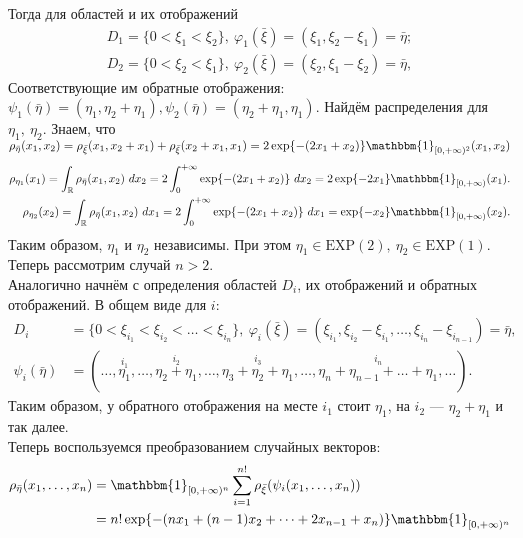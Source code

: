 \documentclass[specialist,
substylefile = spbu_report.rtx,
subf,href,colorlinks=true, 12pt]{disser}
\newcommand{\R}{\mathbb{R}}
\begin{document}
	Тогда для областей и их отображений
	\begin{align*}
		D_1 = \{0 < \xi_1 < \xi_2\},~\varphi_1(\bar{\xi}) = (\xi_1, \xi_2 - \xi_1) = \bar{\eta};
		\\D_2 = \{0 < \xi_2 < \xi_1\},~\varphi_2(\bar{\xi}) = (\xi_2, \xi_1 - \xi_2) = \bar{\eta},
	\end{align*}
	Соответствующие им обратные отображения: $\psi_1(\bar{\eta}) = (\eta_1, \eta_2 + \eta_1), \psi_2(\bar{\eta}) = (\eta_2 + \eta_1, \eta_1)$. Найдём распределения для $\eta_1,~\eta_2$. Знаем, что $\rho_{\bar{\eta}}(x_1, x_2) = \rho_{\bar{\xi}}(x_1, x_2 + x_1) + \rho_{\bar{\xi}}(x_2+x_1, x_1) = 2\exp\{-(2x_1 + x_2)\}\mathbbm{1}_{[0,+\infty)^2}(x_1,x_2)$
	\begin{align*}
		\rho_{\eta_1}(x_1) = \int_\R \rho_{\bar{\eta}}(x_1, x_2)~dx_2 = 2\int_0^{+\infty}\exp\{-(2x_1 + x_2)\}~dx_2 = 2\exp\{-2x_1\}\mathbbm{1}_{[0,+\infty)}(x_1).\\
		\rho_{\eta_2}(x_2) = \int_\R \rho_{\bar{\eta}}(x_1, x_2)~dx_1 = 2\int_0^{+\infty}\exp\{-(2x_1 + x_2)\}~dx_1 = \exp\{-x_2\}\mathbbm{1}_{[0,+\infty)}(x_2).
	\end{align*} 
	Таким образом, $\eta_1$ и $\eta_2$ независимы. При этом $\eta_1\in\mathrm{EXP}(2),~\eta_2\in \mathrm{EXP}(1)$.
	Теперь рассмотрим случай $n>2$.
	\\Аналогично начнём с определения областей $D_i$, их отображений и обратных отображений. В общем виде для $i$:
	\begin{align*}
		D_i &= \{0 < \xi_{i_1} < \xi_{i_2} < \dots < \xi_{i_n}\},~\varphi_i(\bar{\xi}) = (\xi_{i_1}, \xi_{i_2} - \xi_{i_1},\dots,\xi_{i_n} - \xi_{i_{n-1}}) = \bar{\eta},
		\\\psi_i(\bar{\eta}) &= (\dots, \stackrel{i_1}{\eta_1}, \dots, \stackrel{i_2}{\eta_2 + \eta_1}, \dots, \stackrel{i_3}{\eta_3 + \eta_2 + \eta_1}, \dots, \stackrel{i_n}{\eta_n + \eta_{n-1} + \dots + \eta_1}, \dots). 
	\end{align*}
	Таким образом, у обратного отображения на месте $i_1$ стоит $\eta_1$, на $i_2$ --- $\eta_2 + \eta_1$ и так далее.
	\\
	Теперь воспользуемся преобразованием случайных векторов:
	\begin{align*}
		\rho_{\bar{\eta}}(x_1, \dots, x_n)&= \mathbbm{1}_{[0,+\infty)^n}\sum\limits_{i=1}^{n!}\rho_{\bar{\xi}}(\psi_i(x_1,\dots,x_n)) 
		\\&= n!\exp\{-(nx_1 + (n-1)x_2 + \dots + 2x_{n-1} + x_n)\}\mathbbm{1}_{[0,+\infty)^n}
	\end{align*}	
\end{document}
